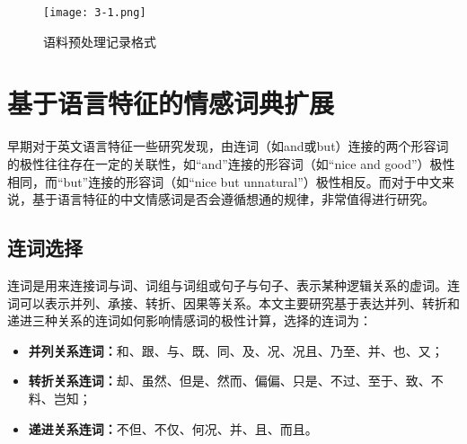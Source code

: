 \begin{figure}[htp]
\centering
\texttt{[image: 3-1.png]}
\caption{语料预处理记录格式}
\label{fig3-1}
\end{figure}

\section{基于语言特征的情感词典扩展}
早期对于英文语言特征一些研究发现，由连词（如and或but）连接的两个形容词的极性往往存在一定的关联性，如“and”连接的形容词（如“nice and good”）极性相同，而“but”连接的形容词（如“nice but unnatural”）极性相反。而对于中文来说，基于语言特征的中文情感词是否会遵循想通的规律，非常值得进行研究。

\subsection{连词选择}
连词是用来连接词与词、词组与词组或句子与句子、表示某种逻辑关系的虚词。连词可以表示并列、承接、转折、因果等关系。本文主要研究基于表达并列、转折和递进三种关系的连词如何影响情感词的极性计算，选择的连词为：
\begin{itemize}
\item \textbf{并列关系连词：}和、跟、与、既、同、及、况、况且、乃至、并、也、又；
\item \textbf{转折关系连词：}却、虽然、但是、然而、偏偏、只是、不过、至于、致、不料、岂知；
\item \textbf{递进关系连词：}不但、不仅、何况、并、且、而且。
\end{itemize}

